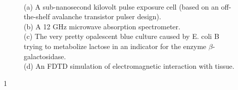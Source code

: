 \documentclass[fleqn,11pt]{article}
\begin{document}
\begin{figure}[H]
	\centering
	
	
	\hfill
	
	\caption*{\\ (a) A sub-nanosecond kilovolt pulse exposure cell (based on an off-the-shelf avalanche transistor pulser design). \\ (b) A 12 GHz microwave absorption spectrometer. \\(c) The very pretty opalescent blue culture caused by E. coli B trying to metabolize lactose in an indicator for the enzyme $\beta$-galactosidase.\\ (d) An FDTD simulation of electromagnetic interaction with tissue. }
\end{figure}






1
\end{document}
